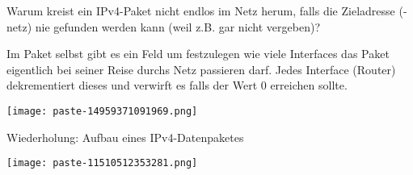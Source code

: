 \documentclass{article}
\begin{document}
\begin{tcolorbox}[colback=white!10!white,colframe=lightgray!75!black,
  savelowerto=\jobname_ex.tex,breakable,enhanced,lines before break=40]

\justifying
Warum kreist ein IPv4-Paket nicht endlos im Netz herum, falls die Zieladresse (-netz) nie gefunden werden kann (weil z.B. gar nicht vergeben)?

\tcblower

\justifying
Im Paket selbst gibt es ein Feld um festzulegen wie viele Interfaces das Paket eigentlich bei seiner Reise durchs Netz passieren darf. Jedes Interface (Router) dekrementiert dieses und verwirft es falls der Wert 0 erreichen sollte.\begin{center}
\texttt{[image: paste-14959371091969.png]}
\end{center}
Wiederholung: Aufbau eines IPv4-Datenpaketes\begin{center}
\texttt{[image: paste-11510512353281.png]}
\end{center}

\end{tcolorbox}
\end{document}
